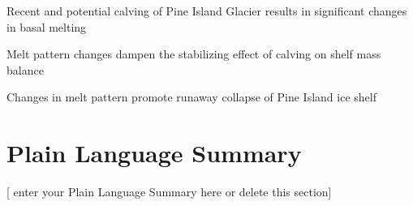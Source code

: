 \documentclass[draft]{agujournal2019}
\begin{document}

\begin{keypoints}
\item Recent and potential calving of Pine Island Glacier results in significant changes in basal melting
\item Melt pattern changes dampen the stabilizing effect of calving on shelf mass balance
\item Changes in melt pattern promote runaway collapse of Pine Island ice shelf  
\end{keypoints}

%
%

%
%
\newcommand{\mpryr}{~m~yr\textsuperscript{-1}}



\begin{abstract}
[ enter your Abstract here ]
\end{abstract}

\section*{Plain Language Summary}
[ enter your Plain Language Summary here or delete this section]
\end{document}
